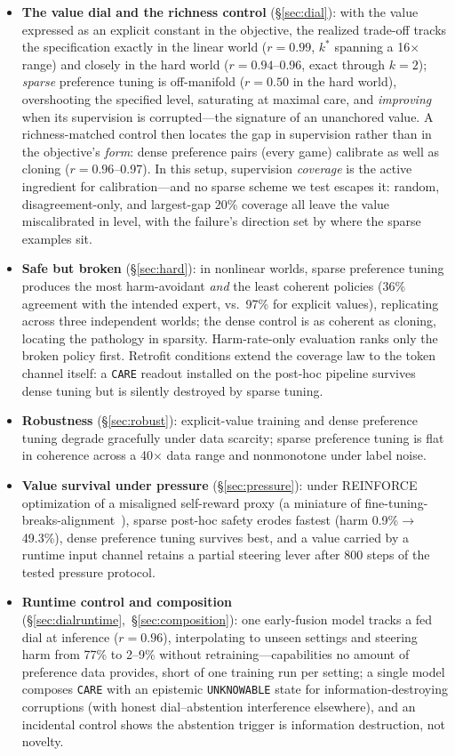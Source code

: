 \documentclass[11pt]{article}
\newcommand{\care}{\texttt{CARE}}
\newcommand{\unknown}{\texttt{UNKNOWABLE}}
\begin{document}
\begin{itemize}
\item \textbf{The value dial and the richness control} (\S\ref{sec:dial}): with the value expressed as an explicit constant in the objective, the realized trade-off tracks the specification exactly in the linear world ($r{=}0.99$, $k^*$ spanning a 16$\times$ range) and closely in the hard world ($r{=}0.94$--0.96, exact through $k{=}2$); \emph{sparse} preference tuning is off-manifold ($r{=}0.50$ in the hard world), overshooting the specified level, saturating at maximal care, and \emph{improving} when its supervision is corrupted---the signature of an unanchored value. A richness-matched control then locates the gap in supervision rather than in the objective's \emph{form}: dense preference pairs (every game) calibrate as well as cloning ($r{=}0.96$--0.97). In this setup, supervision \emph{coverage} is the active ingredient for calibration---and no sparse scheme we test escapes it: random, disagreement-only, and largest-gap 20\% coverage all leave the value miscalibrated in level, with the failure's direction set by where the sparse examples sit.
\item \textbf{Safe but broken} (\S\ref{sec:hard}): in nonlinear worlds, sparse preference tuning produces the most harm-avoidant \emph{and} the least coherent policies (36\% agreement with the intended expert, vs.\ 97\% for explicit values), replicating across three independent worlds; the dense control is as coherent as cloning, locating the pathology in sparsity. Harm-rate-only evaluation ranks only the broken policy first. Retrofit conditions extend the coverage law to the token channel itself: a \care{} readout installed on the post-hoc pipeline survives dense tuning but is silently destroyed by sparse tuning.
\item \textbf{Robustness} (\S\ref{sec:robust}): explicit-value training and dense preference tuning degrade gracefully under data scarcity; sparse preference tuning is flat in coherence across a 40$\times$ data range and nonmonotone under label noise.
\item \textbf{Value survival under pressure} (\S\ref{sec:pressure}): under REINFORCE optimization of a misaligned self-reward proxy (a miniature of fine-tuning-breaks-alignment~\cite{qi2023finetuning}), sparse post-hoc safety erodes fastest (harm 0.9\%$\to$49.3\%), dense preference tuning survives best, and a value carried by a runtime input channel retains a partial steering lever after 800 steps of the tested pressure protocol.
\item \textbf{Runtime control and composition} (\S\ref{sec:dialruntime},~\S\ref{sec:composition}): one early-fusion model tracks a fed dial at inference ($r{=}0.96$), interpolating to unseen settings and steering harm from 77\% to 2--9\% without retraining---capabilities no amount of preference data provides, short of one training run per setting; a single model composes \care{} with an epistemic \unknown{} state for information-destroying corruptions (with honest dial--abstention interference elsewhere), and an incidental control shows the abstention trigger is information destruction, not novelty.

\end{itemize}
\end{document}
